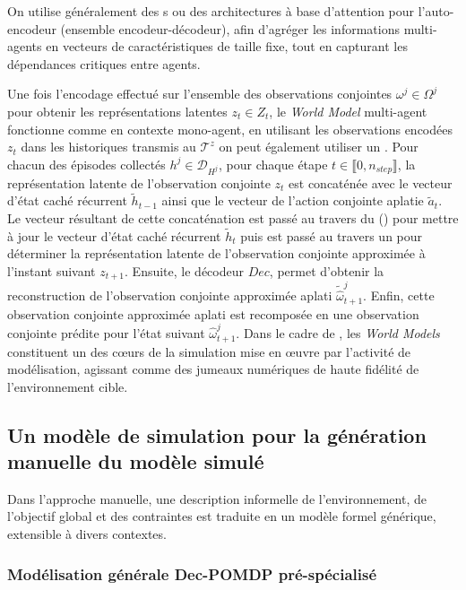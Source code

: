 On utilise généralement des s ou des architectures à base d'attention pour l'auto-encodeur (ensemble encodeur-décodeur), afin d'agréger les informations multi-agents en vecteurs de caractéristiques de taille fixe, tout en capturant les dépendances critiques entre agents.

Une fois l'encodage effectué sur l'ensemble des observations conjointes $\omega^j \in \Omega^{j}$ pour obtenir les représentations latentes $z_t \in Z_t$, le \textit{World Model} multi-agent fonctionne comme en contexte mono-agent, en utilisant les observations encodées $z_t$ dans les historiques transmis au  $\mathcal{T}^{z}$ on peut également utiliser un . Pour chacun des épisodes collectés $h^j \in \mathcal{D}_{H^j}$, pour chaque étape $t \in \llbracket 0, n_{step} \rrbracket$, la représentation latente de l'observation conjointe $z_t$ est concaténée avec le vecteur d'état caché récurrent $\tilde{h}_{t-1}$ ainsi que le vecteur de l'action conjointe aplatie $\tilde{a}_t$. Le vecteur résultant de cette concaténation est passé au travers du  () pour mettre à jour le vecteur d'état caché récurrent $\tilde{h}_{t}$ puis est passé au travers un  pour déterminer la représentation latente de l'observation conjointe approximée à l'instant suivant $z_{t+1}$. Ensuite, le décodeur $Dec$, permet d'obtenir la reconstruction de l'observation conjointe approximée aplati $\tilde{\hat{\omega}}_{t+1}^{j}$. Enfin, cette observation conjointe approximée aplati est recomposée en une observation conjointe prédite pour l'état suivant $\hat{\omega}_{t+1}^{j}$. Dans le cadre de , les \textit{World Models} constituent un des cœurs de la simulation mise en œuvre par l'activité de modélisation, agissant comme des jumeaux numériques de haute fidélité de l'environnement cible.

\subsection{Un modèle de simulation pour la génération manuelle du modèle simulé}

Dans l'approche manuelle, une description informelle de l'environnement, de l'objectif global et des contraintes est traduite en un modèle formel générique, extensible à divers contextes.

\subsubsection{Modélisation générale Dec-POMDP pré-spécialisé}

